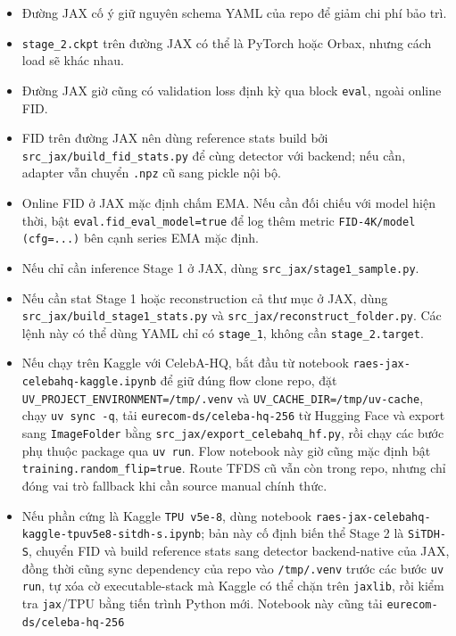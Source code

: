 \begin{itemize}[leftmargin=1.5em]
  \item Đường JAX cố ý giữ nguyên schema YAML của repo để giảm chi phí bảo trì.
  \item \texttt{stage\_2.ckpt} trên đường JAX có thể là PyTorch hoặc Orbax, nhưng
  cách load sẽ khác nhau.
  \item Đường JAX giờ cũng có validation loss định kỳ qua block \texttt{eval},
  ngoài online FID.
  \item FID trên đường JAX nên dùng reference stats build bởi
  \texttt{src\_jax/build\_fid\_stats.py} để cùng detector với backend; nếu cần,
  adapter vẫn chuyển \texttt{.npz} cũ sang pickle nội bộ.
  \item Online FID ở JAX mặc định chấm EMA. Nếu cần đối chiếu với model hiện
  thời, bật \texttt{eval.fid\_eval\_model=true} để log thêm metric
  \texttt{FID-4K/model (cfg=...)} bên cạnh series EMA mặc định.
  \item Nếu chỉ cần inference Stage 1 ở JAX, dùng \texttt{src\_jax/stage1\_sample.py}.
  \item Nếu cần stat Stage 1 hoặc reconstruction cả thư mục ở JAX, dùng
  \texttt{src\_jax/build\_stage1\_stats.py} và \texttt{src\_jax/reconstruct\_folder.py}.
  Các lệnh này có thể dùng YAML chỉ có \texttt{stage\_1}, không cần
  \texttt{stage\_2.target}.
  \item Nếu chạy trên Kaggle với CelebA-HQ, bắt đầu từ notebook
  \texttt{raes-jax-celebahq-kaggle.ipynb} để giữ đúng flow clone repo, đặt
  \texttt{UV\_PROJECT\_ENVIRONMENT=/tmp/.venv} và
  \texttt{UV\_CACHE\_DIR=/tmp/uv-cache}, chạy \texttt{uv sync -q}, tải
  \texttt{eurecom-ds/celeba-hq-256} từ Hugging Face và export sang
  \texttt{ImageFolder} bằng \texttt{src\_jax/export\_celebahq\_hf.py}, rồi
  chạy các bước phụ thuộc package qua \texttt{uv run}. Flow notebook này giờ
  cũng mặc định bật \texttt{training.random\_flip=true}. Route TFDS cũ vẫn còn
  trong repo, nhưng chỉ đóng vai trò fallback khi cần source manual chính thức.
  \item Nếu phần cứng là Kaggle \texttt{TPU v5e-8}, dùng notebook
  \texttt{raes-jax-celebahq-kaggle-tpuv5e8-sitdh-s.ipynb}; bản này cố định biến
  thể Stage 2 là \texttt{SiTDH-S}, chuyển FID và build reference stats sang
  detector backend-native của JAX, đồng thời cũng sync dependency của repo vào
  \texttt{/tmp/.venv} trước các bước \texttt{uv run}, tự xóa cờ executable-stack mà
  Kaggle có thể chặn trên \texttt{jaxlib}, rồi kiểm tra \texttt{jax}/TPU bằng
  tiến trình Python mới. Notebook này cũng tải \texttt{eurecom-ds/celeba-hq-256}

\end{itemize}

